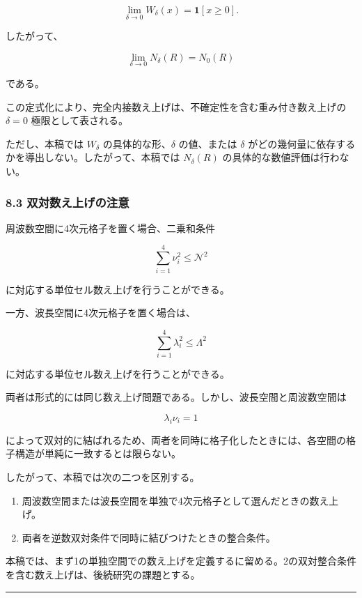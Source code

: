 \documentclass[
]{ltjsarticle}
\providecommand{\tightlist}{%
  \setlength{\itemsep}{0pt}\setlength{\parskip}{0pt}}
\begin{document}
\[
\lim_{\delta\to0}
W_\delta(x)
=
\mathbf{1}[x\ge0].
\]

したがって、

\[
\lim_{\delta\to0}N_\delta(R)=N_0(R)
\]

である。

この定式化により、完全内接数え上げは、不確定性を含む重み付き数え上げの
\(\delta=0\) 極限として表される。

ただし、本稿では \(W_\delta\) の具体的な形、\(\delta\) の値、または
\(\delta\) がどの幾何量に依存するかを導出しない。したがって、本稿では
\(N_\delta(R)\) の具体的な数値評価は行わない。

\subsubsection{8.3
双対数え上げの注意}\label{ux53ccux5bfeux6570ux3048ux4e0aux3052ux306eux6ce8ux610f}

周波数空間に4次元格子を置く場合、二乗和条件

\[
\sum_{i=1}^{4} \nu_i^2\le \mathcal{N}^2
\]

に対応する単位セル数え上げを行うことができる。

一方、波長空間に4次元格子を置く場合は、

\[
\sum_{i=1}^{4} \lambda_i^2\le \Lambda^2
\]

に対応する単位セル数え上げを行うことができる。

両者は形式的には同じ数え上げ問題である。しかし、波長空間と周波数空間は

\[
\lambda_i\nu_i=1
\]

によって双対的に結ばれるため、両者を同時に格子化したときには、各空間の格子構造が単純に一致するとは限らない。

したがって、本稿では次の二つを区別する。

\begin{enumerate}
\def\labelenumi{\arabic{enumi}.}
\tightlist
\item
  周波数空間または波長空間を単独で4次元格子として選んだときの数え上げ。\\
\item
  両者を逆数双対条件で同時に結びつけたときの整合条件。
\end{enumerate}

本稿では、まず1の単独空間での数え上げを定義するに留める。2の双対整合条件を含む数え上げは、後続研究の課題とする。

\begin{center}\rule{0.5\linewidth}{0.5pt}\end{center}
\end{document}
